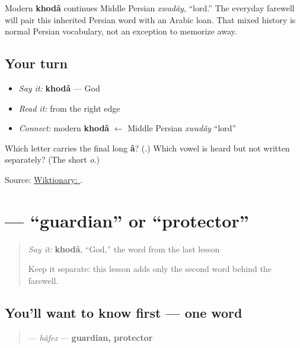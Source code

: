 \begin{cousinweb}
Modern \textbf{khodâ} continues Middle Persian \emph{xwadây}, “lord.” The everyday farewell will pair this inherited Persian word with an Arabic loan. That mixed history is normal Persian vocabulary, not an exception to memorize away.
\end{cousinweb}

\subsection*{Your turn}
\begin{itemize}
\raggedright
  \item \emph{Say it:} \textbf{khodâ} — God
  \item \emph{Read it:} \textbf{} from the right edge
  \item \emph{Connect:} modern \textbf{khodâ} $\leftarrow$ Middle Persian \emph{xwadây} “lord”
\end{itemize}

\begin{tcolorbox}[breakable,colback=teal!4,colframe=teal!35!black,title={Before you move on}]
Which letter carries the final long \textbf{â}? (\textbf{}.) Which vowel is heard but not written separately? (The short \emph{o}.)

Source: \href{https://en.wiktionary.org/wiki/\%D8\%AE\%D8\%AF\%D8\%A7}{Wiktionary: }.
\end{tcolorbox}
\section[\texorpdfstring{\fa{حافظ} (hâfez)}{حافظ (hâfez)}]{ — “guardian” or “protector”}

\label{lesson:FA-C05-hafez}



\begin{quote}
\emph{Say it:} \textbf{khodâ}, “God,” the word from the last lesson

Keep it separate: this lesson adds only the second word behind the farewell.
\end{quote}

\subsection*{You'll want to know first — one word}
\begin{quote}
\textbf{} — \emph{hâfez} — \textbf{guardian, protector}
\end{quote}

